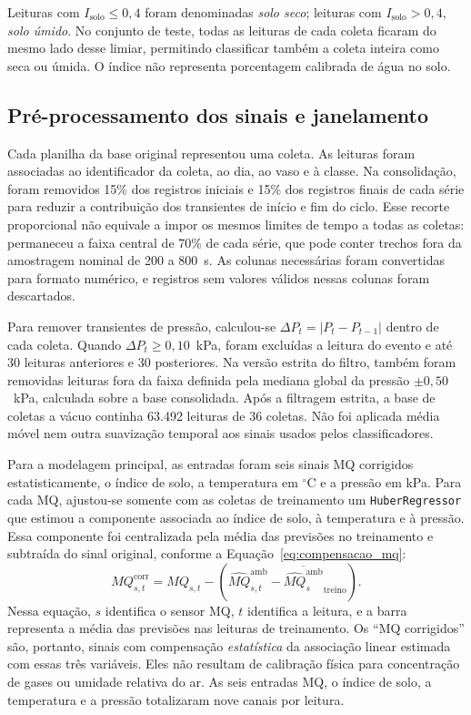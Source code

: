 Leituras com $I_{\mathrm{solo}}\leq 0{,}4$ foram denominadas \emph{solo seco};
leituras com $I_{\mathrm{solo}}>0{,}4$, \emph{solo úmido}. No conjunto de
teste, todas as leituras de cada coleta ficaram do mesmo lado desse limiar,
permitindo classificar também a coleta inteira como seca ou úmida. O índice não
representa porcentagem calibrada de água no solo.

\subsection{Pré-processamento dos sinais e janelamento}
\label{subsec:preprocessamento}

Cada planilha da base original representou uma coleta. As leituras foram
associadas ao identificador da coleta, ao dia, ao vaso e à classe. Na
consolidação, foram removidos 15\% dos registros iniciais e 15\% dos
registros finais de cada série para reduzir a contribuição dos transientes
de início e fim do ciclo. Esse recorte proporcional não equivale a impor
os mesmos limites de tempo a todas as coletas: permaneceu a faixa central
de 70\% de cada série, que pode conter trechos fora da amostragem nominal
de 200 a 800~s. As colunas necessárias foram
convertidas para formato numérico, e registros sem valores válidos nessas
colunas foram descartados.

Para remover transientes de pressão, calculou-se
$\Delta P_t=|P_t-P_{t-1}|$ dentro de cada coleta. Quando
$\Delta P_t\geq 0{,}10$~kPa, foram excluídas a leitura do evento e até
30 leituras anteriores e 30 posteriores. Na versão estrita do filtro,
também foram removidas leituras fora da faixa definida pela mediana global
da pressão $\pm 0{,}50$~kPa, calculada sobre a base consolidada. Após a
filtragem estrita, a base de coletas a vácuo continha 63.492 leituras de
36 coletas. Não foi aplicada média móvel nem outra suavização temporal
aos sinais usados pelos classificadores.

Para a modelagem principal, as entradas foram seis sinais MQ corrigidos
estatisticamente, o índice de solo, a temperatura em $^{\circ}$C e a
pressão em kPa. Para cada MQ, ajustou-se somente com as coletas de
treinamento um \texttt{HuberRegressor} que estimou a componente associada
ao índice de solo, à temperatura e à pressão. Essa componente foi
centralizada pela média das previsões no treinamento e subtraída do
sinal original, conforme a Equação~\eqref{eq:compensacao_mq}:
\begin{equation}
    \label{eq:compensacao_mq}
    MQ_{s,t}^{\mathrm{corr}} = MQ_{s,t} -
    \left(\widehat{MQ}_{s,t}^{\mathrm{amb}}-
    \overline{\widehat{MQ}_{s}^{\mathrm{amb}}}_{\mathrm{treino}}\right).
\end{equation}
Nessa equação, $s$ identifica o sensor MQ, $t$ identifica a leitura, e a
barra representa a média das previsões nas leituras de treinamento. Os
``MQ corrigidos'' são, portanto, sinais com compensação \emph{estatística}
da associação linear estimada com essas três variáveis. Eles não resultam
de calibração física para concentração de gases ou umidade relativa do ar.
As seis entradas MQ, o índice de solo, a temperatura e a pressão totalizaram
nove canais por leitura.

